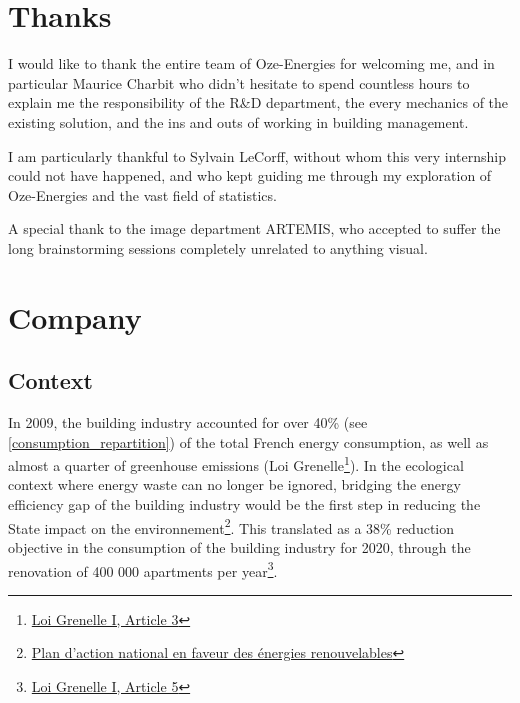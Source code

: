 \documentclass[12pt]{article}
\begin{document}
\section{Thanks}
I would like to thank the entire team of Oze-Energies for welcoming me, and in particular Maurice Charbit who didn't hesitate to spend countless hours to explain me the responsibility of the R\&D department, the every mechanics of the existing solution, and the ins and outs of working in building management.

I am particularly thankful to Sylvain LeCorff, without whom this very internship could not have happened, and who kept guiding me through my exploration of Oze-Energies and the vast field of statistics.

A special thank to the image department ARTEMIS, who accepted to suffer the long brainstorming sessions completely unrelated to anything visual. 

\section{Company}
\label{sec:company}

\subsection{Context}
In 2009, the building industry accounted for over 40\% (see \ref{consumption_repartition}) of the total French energy consumption, as well as almost a quarter of greenhouse emissions (Loi Grenelle\footnote{\href{https://www.legifrance.gouv.fr/loda/id/JORFTEXT000020949548/2020-09-21/}{Loi Grenelle I, Article 3}}). In the ecological context where energy waste can no longer be ignored, bridging the energy efficiency gap of the building industry would be the first step in reducing the State impact on the environnement\footnote{\href{http://temis.documentation.developpement-durable.gouv.fr/docs/Temis/0067/Temis-0067836/18854.pdf}{Plan d'action national en faveur des énergies renouvelables}}. This translated as a 38\% reduction objective in the consumption of the building industry for 2020, through the renovation of 400 000 apartments per year\footnote{\href{https://www.legifrance.gouv.fr/loda/id/JORFTEXT000020949548/2020-09-21/}{Loi Grenelle I, Article 5}}.
\end{document}
